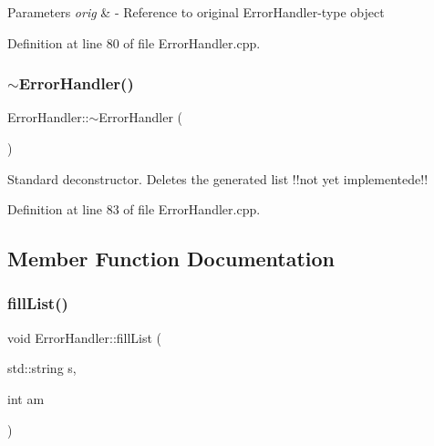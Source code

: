 \begin{DoxyParams}{Parameters}
{\em orig} & -\/ Reference to original Error\+Handler-\/type object \\
\hline
\end{DoxyParams}


Definition at line 80 of file Error\+Handler.\+cpp.

\mbox{\label{classErrorHandler_a73c7e690b864697e507aaeb537b3c3e5}} 
\subsubsection{\texorpdfstring{$\sim$ErrorHandler()}{~ErrorHandler()}}
{\footnotesize\ttfamily Error\+Handler\+::$\sim$\+Error\+Handler (\begin{DoxyParamCaption}{ }\end{DoxyParamCaption})\hspace{0.3cm}{\ttfamily [virtual]}}

Standard deconstructor. Deletes the generated list !!not yet implementede!! 

Definition at line 83 of file Error\+Handler.\+cpp.



\subsection{Member Function Documentation}
\mbox{\label{classErrorHandler_a3036b8ff4299ac0505b6b2ca6fab11a1}} 
\subsubsection{\texorpdfstring{fillList()}{fillList()}\hspace{0.1cm}{\footnotesize\ttfamily [1/2]}}
{\footnotesize\ttfamily void Error\+Handler\+::fill\+List (\begin{DoxyParamCaption}\item[{std\+::string}]{s,  }\item[{int}]{am }\end{DoxyParamCaption})\hspace{0.3cm}{\ttfamily [private]}}



